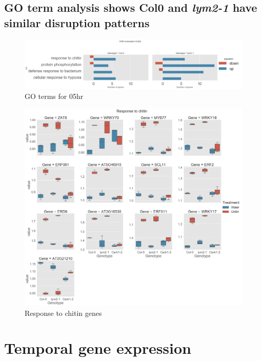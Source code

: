 \documentclass[../main.tex]{subfiles}
\begin{document}
\subsection{GO term analysis shows Col0 and \textit{lym2-1} have similar
  disruption patterns}


\begin{figure}[ht]
  \centering
  \includegraphics[width=\columnwidth]{figures/05hrGO.png}
  \caption{\label{fig:05hrGO} GO terms for 05hr}
\end{figure}



\begin{figure}[ht]
  \centering
  \includegraphics[width=\textwidth, height=\textheight, keepaspectratio]{figures/response to chitin.png}
  \caption{\label{fig:respchitin} Response to chitin genes}
\end{figure}







\section{Temporal gene expression}
\label{sec:tempexpress}
\end{document}
